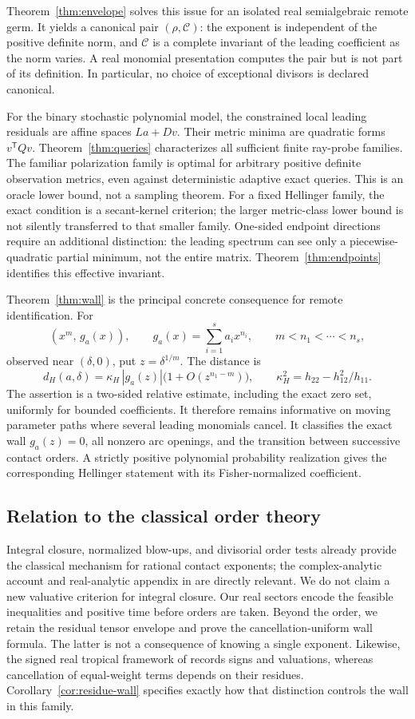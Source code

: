 \documentclass[11pt,reqno]{amsart}
\numberwithin{equation}{section}
\theoremstyle{definition}
\theoremstyle{remark}
\begin{document}
Theorem~\ref{thm:envelope} solves this issue for an isolated real semialgebraic remote germ. It yields a canonical pair $(\rho,\mathcal C)$: the exponent is independent of the positive definite norm, and $\mathcal C$ is a complete invariant of the leading coefficient as the norm varies. A real monomial presentation computes the pair but is not part of its definition. In particular, no choice of exceptional divisors is declared canonical.

For the binary stochastic polynomial model, the constrained local leading residuals are affine spaces $La+Dv$. Their metric minima are quadratic forms $v^{\mathsf T}Qv$. Theorem~\ref{thm:queries} characterizes all sufficient finite ray-probe families. The familiar polarization family is optimal for arbitrary positive definite observation metrics, even against deterministic adaptive exact queries. This is an oracle lower bound, not a sampling theorem. For a fixed Hellinger family, the exact condition is a secant-kernel criterion; the larger metric-class lower bound is not silently transferred to that smaller family. One-sided endpoint directions require an additional distinction: the leading spectrum can see only a piecewise-quadratic partial minimum, not the entire matrix. Theorem~\ref{thm:endpoints} identifies this effective invariant.

Theorem~\ref{thm:wall} is the principal concrete consequence for remote identification. For
\[
 (x^m,\,g_a(x)),\qquad g_a(x)=\sum_{i=1}^s a_i x^{n_i},
 \qquad m<n_1<\cdots<n_s,
\]
observed near $(\delta,0)$, put $z=\delta^{1/m}$. The distance is
\[
 d_H(a,\delta)=\kappa_H\,|g_a(z)|\bigl(1+O(z^{n_1-m})\bigr),
 \qquad \kappa_H^2=h_{22}-h_{12}^2/h_{11}.
\]
The assertion is a two-sided relative estimate, including the exact zero set, uniformly for bounded coefficients. It therefore remains informative on moving parameter paths where several leading monomials cancel. It classifies the exact wall $g_a(z)=0$, all nonzero arc openings, and the transition between successive contact orders. A strictly positive polynomial probability realization gives the corresponding Hellinger statement with its Fisher-normalized coefficient.

\subsection*{Relation to the classical order theory}
Integral closure, normalized blow-ups, and divisorial order tests already provide the classical mechanism for rational contact exponents; the complex-analytic account and real-analytic appendix in \cite{LJT} are directly relevant. We do not claim a new valuative criterion for integral closure. Our real sectors encode the feasible inequalities and positive time before orders are taken. Beyond the order, we retain the residual tensor envelope and prove the cancellation-uniform wall formula. The latter is not a consequence of knowing a single exponent. Likewise, the signed real tropical framework of \cite{JSY} records signs and valuations, whereas cancellation of equal-weight terms depends on their residues. Corollary~\ref{cor:residue-wall} specifies exactly how that distinction controls the wall in this family.
\end{document}
